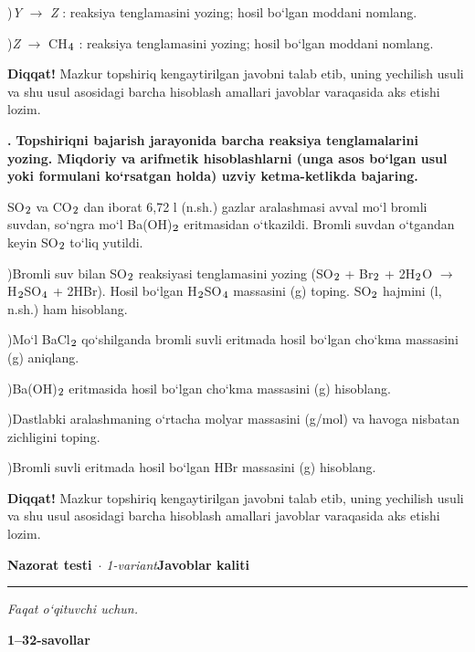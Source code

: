 \documentclass[11pt,a4paper]{article}
\renewcommand{\textsubscript}[1]{\ensuremath{_{\text{\fontsize{8}{8}\selectfont #1}}}}
\newcommand{\qn}[1]{\textbf{\fontsize{11.5}{13}\selectfont #1}}
\newcommand{\qsep}{\par\vspace{1pt}\noindent\rule{0pt}{0.4pt}\par\vspace{5pt}}
\newcommand{\diqqat}[1]{\par\smallskip\noindent\textbf{Diqqat!} #1\par\medskip}
\begin{document}
)\textit{Y} $\to$ \textit{Z} : reaksiya tenglamasini yozing; hosil bo`lgan moddani nomlang.\par
{})\textit{Z} $\to$ CH\textsubscript{4} : reaksiya tenglamasini yozing; hosil bo`lgan moddani nomlang.\par
\diqqat{Mazkur topshiriq kengaytirilgan javobni talab etib, uning yechilish usuli va shu usul asosidagi barcha hisoblash amallari javoblar varaqasida aks etishi lozim.}\qsep
\noindent\qn{43.} \textbf{Topshiriqni bajarish jarayonida barcha reaksiya tenglamalarini yozing. Miqdoriy va arifmetik hisoblashlarni (unga asos bo`lgan usul yoki formulani ko`rsatgan holda) uzviy ketma-ketlikda bajaring.}\par\smallskip
SO\textsubscript{2} va CO\textsubscript{2} dan iborat 6,72 l (n.sh.) gazlar aralashmasi avval mo`l bromli suvdan, so`ngra mo`l Ba(OH)\textsubscript{2} eritmasidan o`tkazildi. Bromli suvdan o`tgandan keyin SO\textsubscript{2} to`liq yutildi.\par
{})Bromli suv bilan SO\textsubscript{2} reaksiyasi tenglamasini yozing (SO\textsubscript{2} + Br\textsubscript{2} + 2H\textsubscript{2}O $\to$ H\textsubscript{2}SO\textsubscript{4} + 2HBr). Hosil bo`lgan H\textsubscript{2}SO\textsubscript{4} massasini (g) toping. SO\textsubscript{2} hajmini (l, n.sh.) ham hisoblang.\par
{})Mo`l BaCl\textsubscript{2} qo`shilganda bromli suvli eritmada hosil bo`lgan cho`kma massasini (g) aniqlang.\par
{})Ba(OH)\textsubscript{2} eritmasida hosil bo`lgan cho`kma massasini (g) hisoblang.\par
{})Dastlabki aralashmaning o`rtacha molyar massasini (g/mol) va havoga nisbatan zichligini toping.\par
{})Bromli suvli eritmada hosil bo`lgan HBr massasini (g) hisoblang.\par
\diqqat{Mazkur topshiriq kengaytirilgan javobni talab etib, uning yechilish usuli va shu usul asosidagi barcha hisoblash amallari javoblar varaqasida aks etishi lozim.}\qsep
\newpage
\noindent\textbf{\fontsize{13}{15}\selectfont Nazorat testi}\ \textit{$\cdot$ 1-variant}\hfill \textbf{Javoblar kaliti}\par\smallskip\hrule\smallskip
\textit{Faqat o`qituvchi uchun.}\par\medskip
\noindent\textbf{1--32-savollar}\par\smallskip
\end{document}
